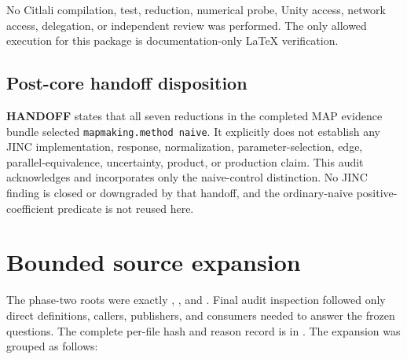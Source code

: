 \documentclass[10pt]{article}
\newcommand{\handofflabel}{\textbf{HANDOFF}}
\begin{document}
No Citlali compilation, test, reduction, numerical probe, Unity access,
network access, delegation, or independent review was performed.  The only
allowed execution for this package is documentation-only LaTeX verification.

\subsection{Post-core handoff disposition}

\handofflabel{}  states that all seven reductions
in the completed MAP evidence bundle selected \texttt{mapmaking.method naive}.
It explicitly does not establish any JINC implementation, response,
normalization, parameter-selection, edge, parallel-equivalence, uncertainty,
product, or production claim.  This audit acknowledges and incorporates only
the naive-control distinction.  No JINC finding is closed or downgraded by
that handoff, and the ordinary-naive positive-coefficient predicate is not
reused here.

\section{Bounded source expansion}

The phase-two roots were exactly
,
, and
.  Final audit
inspection followed only direct definitions, callers, publishers, and
consumers needed to answer the frozen questions.  The complete per-file hash
and reason record is in
.
The expansion was grouped as follows:
\end{document}
